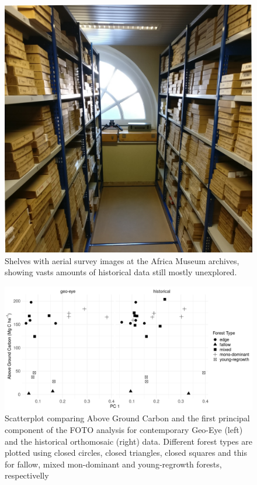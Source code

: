 \documentclass[landscape]{article}
\begin{document}
\begin{figure}

{\centering \includegraphics[width=14.39in,height=0.75\textheight]{./figures/archives_aerial_photos_2} 

}

\caption{Shelves with aerial survey images at the Africa Museum archives, showing vasts amounts of historical data still mostly unexplored.}\label{fig:unnamed-chunk-5}
\end{figure}

\begin{figure}

{\centering \includegraphics[width=0.75\linewidth]{./figures/foto_pc1_agc} 

}

\caption{Scatterplot comparing Above Ground Carbon and the first principal component of the FOTO analysis for contemporary Geo-Eye (left) and the historical orthomosaic (right) data. Different forest types are plotted using closed circles, closed triangles, closed squares and this for fallow, mixed mon-dominant and young-regrowth forests, respectivelly }\label{fig:unnamed-chunk-6}
\end{figure}
\end{document}
